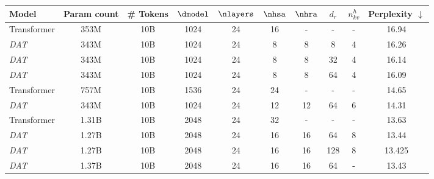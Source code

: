 \begin{tabular}{@{}lcc|cccccc|c@{}}
    \toprule
    Model        & Param count   & \# Tokens &$\dmodel$&$\nlayers$& $\nhsa$  & $\nhra$ & $d_r$ & $n_{kv}^{h}$ & Perplexity $\downarrow$ \\ \midrule\hline
    Transformer  & 353M   & 10B       & 1024    & 24       & 16       & -        & -     & -           & 16.94     \\
    \textit{DAT} & 343M   & 10B       & 1024    & 24       & 8        & 8        & 8     & 4           & 16.26     \\
    \textit{DAT} & 343M   & 10B       & 1024    & 24       & 8        & 8        & 32    & 4           & 16.14     \\
    \textit{DAT} & 343M   & 10B       & 1024    & 24       & 8        & 8        & 64    & 4           & 16.09     \\\midrule
    Transformer  & 757M   & 10B       & 1536    & 24       & 24       & -        & -     & -           & 14.65     \\
    \textit{DAT} & 343M   & 10B       & 1024    & 24       & 12       & 12       & 64     & 6          & 14.31     \\
    Transformer  & 1.31B  & 10B       & 2048    & 24       & 32       & -        & -     & -           & 13.63     \\
    \textit{DAT} & 1.27B  & 10B       & 2048    & 24       & 16       & 16       & 64    & 8           & 13.44     \\
    \textit{DAT} & 1.27B  & 10B       & 2048    & 24       & 16       & 16       & 128   & 8           & 13.425     \\
    \textit{DAT} & 1.37B  & 10B       & 2048    & 24       & 16       & 16       & 64    & -           & 13.43     \\ \bottomrule
\end{tabular}%
